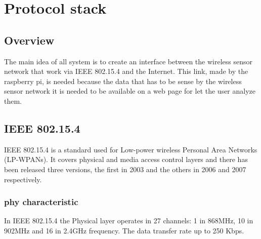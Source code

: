\section{Protocol stack}
\subsection{Overview}
The main idea of all system is to create an interface between the wireless sensor network that work via IEEE 802.15.4 and the Internet. This link, made by the raspberry pi, is needed because the data that has to be sense by the wireless sensor network it is needed to be available on a web page for let the user analyze them. 

\subsection{IEEE 802.15.4}
IEEE 802.15.4 is a standard used for Low-power wireless Personal Area Networks (LP-WPANs). It covers physical and media access control layers and there has been released three versions, the first in 2003 and the others in 2006 and 2007 respectively.
\subsubsection{phy characteristic}
In IEEE 802.15.4 the Physical layer operates in 27 channels: 1 in 868MHz, 10 in 902MHz and 16 in 2.4GHz frequency. The data transfer rate up to 250 Kbps.\cite{slide}\\
